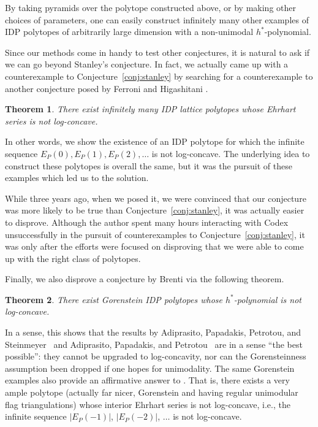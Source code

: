 \documentclass[11pt, letterpaper, english]{amsart}
\theoremstyle{teoremas}
\newtheorem{theorem}{Theorem}[section]
\theoremstyle{definition}
\begin{document}
By taking pyramids over the polytope constructed above, or by making other choices of parameters, one can easily construct infinitely many other examples of IDP polytopes of arbitrarily large dimension with a non-unimodal $h^*$-polynomial.

Since our methods come in handy to test other conjectures, it is natural to ask if we can go beyond Stanley's conjecture. In fact, we actually came up with a counterexample to Conjecture~\ref{conj:stanley} by searching for a counterexample to another conjecture posed by Ferroni and Higashitani \cite[Conjecture~1.2]{ferroni-higashitani}. 

\begin{theorem}\label{thm:main-series}
    There exist infinitely many IDP lattice polytopes whose Ehrhart series is not log-concave. 
\end{theorem}

In other words, we show the existence of an IDP polytope for which the infinite sequence $E_P(0), E_P(1), E_P(2),\ldots$ is not log-concave. The underlying idea to construct these polytopes is overall the same, but it was the pursuit of these examples which led us to the solution. 

While three years ago, when we posed it, we were convinced that our conjecture was more likely to be true than Conjecture~\ref{conj:stanley}, it was actually easier to disprove. Although the author spent many hours interacting with Codex unsuccessfully in the pursuit of counterexamples to Conjecture~\ref{conj:stanley}, it was only after the efforts were focused on disproving \cite[Conjecture~1.2]{ferroni-higashitani} that we were able to come up with the right class of polytopes. 

Finally, we also disprove a conjecture by Brenti \cite[Conjecture~5.2]{brenti-update} via the following theorem.

\begin{theorem}\label{thm:main-gorenstein}
    There exist Gorenstein IDP polytopes whose $h^*$-polynomial is not log-concave.
\end{theorem}

In a sense, this shows that the results by Adiprasito, Papadakis, Petrotou, and Steinmeyer~\cite{adiprasito-papadakis-petrotou-steinmeyer} and Adiprasito, Papadakis, and Petrotou~\cite{adiprasito-papadakis-petrotou} are in a sense ``the best possible'': they cannot be upgraded to log-concavity, nor can the Gorensteinness assumption been dropped if one hopes for unimodality.
The same Gorenstein examples also provide an affirmative answer to \cite[Question~5.12(b)]{ferroni-higashitani}. That is, there exists a very ample polytope (actually far nicer, Gorenstein and having regular unimodular flag triangulations) whose interior Ehrhart series is not log-concave, i.e., the infinite sequence $|E_P(-1)|$, $|E_P(-2)|$, $\ldots$ is not log-concave.
\end{document}
